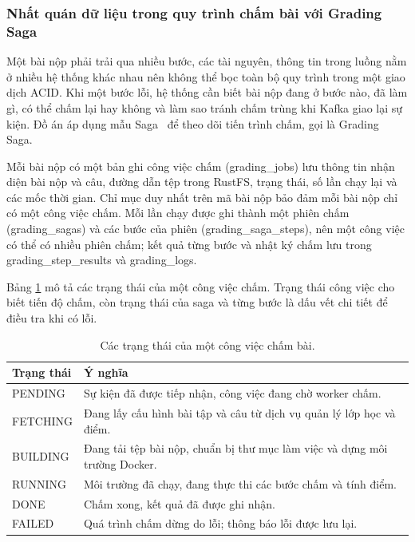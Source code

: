 \documentclass[../BTL.tex]{subfiles}
\begin{document}
\subsubsection{Nhất quán dữ liệu trong quy trình chấm bài với Grading Saga}
\label{sec:grading-saga}

Một bài nộp phải trải qua nhiều bước, các tài nguyên, thông tin trong luồng nằm ở nhiều hệ thống khác nhau nên không thể bọc toàn bộ quy trình trong một giao dịch ACID. Khi một bước lỗi, hệ thống cần biết bài nộp đang ở bước nào, đã làm gì, có thể chấm lại hay không và làm sao tránh chấm trùng khi Kafka giao lại sự kiện. Đồ án áp dụng mẫu Saga~\cite{newman2021building} để theo dõi tiến trình chấm, gọi là Grading Saga.

Mỗi bài nộp có một bản ghi công việc chấm (grading\_jobs) lưu thông tin nhận diện bài nộp và câu, đường dẫn tệp trong RustFS, trạng thái, số lần chạy lại và các mốc thời gian. Chỉ mục duy nhất trên mã bài nộp bảo đảm mỗi bài nộp chỉ có một công việc chấm. Mỗi lần chạy được ghi thành một phiên chấm (grading\_sagas) và các bước của phiên (grading\_saga\_steps), nên một công việc có thể có nhiều phiên chấm; kết quả từng bước và nhật ký chấm lưu trong grading\_step\_results và grading\_logs.

Bảng \ref{tab:grading-job-status} mô tả các trạng thái của một công việc chấm. Trạng thái công việc cho biết tiến độ chấm, còn trạng thái của saga và từng bước là dấu vết chi tiết để điều tra khi có lỗi.

\begin{table}[H]
\centering
\begin{tabularx}{\textwidth}{|p{2.8cm}|X|}
\hline
Trạng thái & Ý nghĩa \\ \hline
PENDING & Sự kiện đã được tiếp nhận, công việc đang chờ worker chấm. \\ \hline
FETCHING & Đang lấy cấu hình bài tập và câu từ dịch vụ quản lý lớp học và điểm. \\ \hline
BUILDING & Đang tải tệp bài nộp, chuẩn bị thư mục làm việc và dựng môi trường Docker. \\ \hline
RUNNING & Môi trường đã chạy, đang thực thi các bước chấm và tính điểm. \\ \hline
DONE & Chấm xong, kết quả đã được ghi nhận. \\ \hline
FAILED & Quá trình chấm dừng do lỗi; thông báo lỗi được lưu lại. \\ \hline
\end{tabularx}
\caption{Các trạng thái của một công việc chấm bài.}
\label{tab:grading-job-status}
\end{table}
\end{document}
